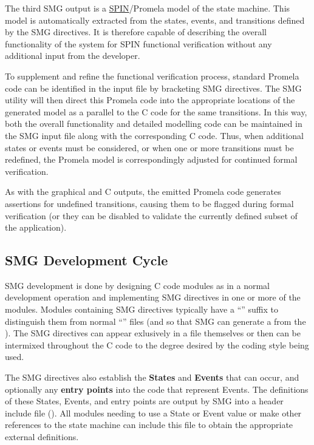 The third SMG output is a \hyperlink{SPIN}{SPIN}/Promela model of the
state machine.  This model is automatically extracted from the states,
events, and transitions defined by the SMG directives.  It is
therefore capable of describing the overall functionality of the
system for SPIN functional verification without any additional input
from the developer.

To supplement and refine the functional verification process, standard
Promela code can be identified in the input file by bracketing SMG
directives.  The SMG utility will then direct this Promela code into
the appropriate locations of the generated model as a parallel to the
C code for the same transitions.  In this way, both the overall
functionality and detailed modelling code can be maintained in the SMG
input file along with the corresponding C code.  Thus, when additional
states or events must be considered, or when one or more transitions
must be redefined, the Promela model is correspondingly adjusted for
continued formal verification.

As with the graphical and C outputs, the emitted Promela code
generates assertions for undefined transitions, causing them to be
flagged during formal verification (or they can be disabled to
validate the currently defined subset of the application).


\subsection{SMG Development Cycle}

SMG development is done by designing C code modules as in a normal
development operation and implementing SMG directives in one or more
of the modules.  Modules containing SMG directives typically have a
``'' suffix to distinguish them from normal ``''
files (and so that SMG can generate a  from the ).
The SMG directives can appear exlusively in a file themselves or then
can be intermixed throughout the C code to the degree desired by the
coding style being used.

The SMG directives also establish the {\bf States} and {\bf Events}
that can occur, and optionally any {\bf entry points} into the code
that represent Events.  The definitions of these States, Events, and
entry points are output by SMG into a header include file
().  All modules needing to use a State or Event
value or make other references to the state machine can include this
file to obtain the appropriate external definitions.

